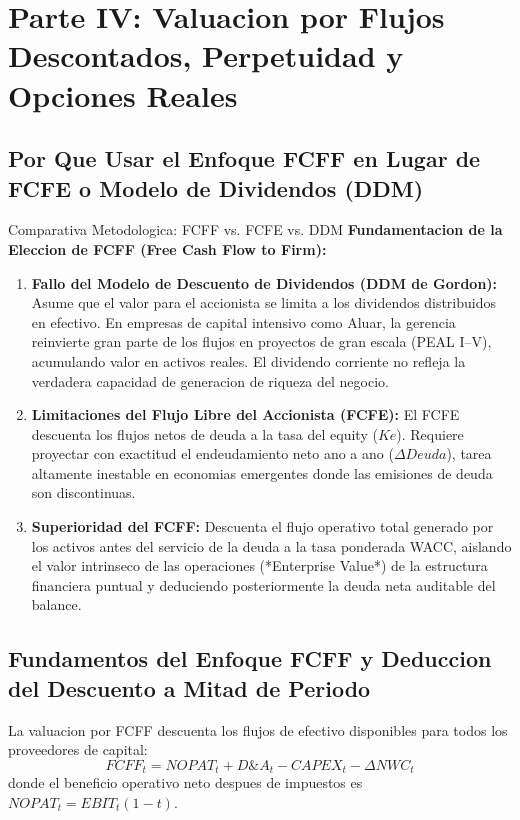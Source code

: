 \documentclass[10pt,a4paper]{article}
\theoremstyle{definition}
\begin{document}
\section{Parte IV: Valuacion por Flujos Descontados, Perpetuidad y Opciones Reales}

\subsection{Por Que Usar el Enfoque FCFF en Lugar de FCFE o Modelo de Dividendos (DDM)}

\begin{conceptbox}{Comparativa Metodologica: FCFF vs. FCFE vs. DDM}
\textbf{Fundamentacion de la Eleccion de FCFF (Free Cash Flow to Firm):}
\begin{enumerate}
    \item \textbf{Fallo del Modelo de Descuento de Dividendos (DDM de Gordon):} Asume que el valor para el accionista se limita a los dividendos distribuidos en efectivo. En empresas de capital intensivo como Aluar, la gerencia reinvierte gran parte de los flujos en proyectos de gran escala (PEAL I--V), acumulando valor en activos reales. El dividendo corriente no refleja la verdadera capacidad de generacion de riqueza del negocio.
    \item \textbf{Limitaciones del Flujo Libre del Accionista (FCFE):} El FCFE descuenta los flujos netos de deuda a la tasa del equity ($Ke$). Requiere proyectar con exactitud el endeudamiento neto ano a ano ($\Delta Deuda$), tarea altamente inestable en economias emergentes donde las emisiones de deuda son discontinuas.
    \item \textbf{Superioridad del FCFF:} Descuenta el flujo operativo total generado por los activos antes del servicio de la deuda a la tasa ponderada WACC, aislando el valor intrinseco de las operaciones (*Enterprise Value*) de la estructura financiera puntual y deduciendo posteriormente la deuda neta auditable del balance.
\end{enumerate}
\end{conceptbox}

\subsection{Fundamentos del Enfoque FCFF y Deduccion del Descuento a Mitad de Periodo}
La valuacion por FCFF descuenta los flujos de efectivo disponibles para todos los proveedores de capital:
\begin{equation}
FCFF_t = NOPAT_t + D\&A_t - CAPEX_t - \Delta NWC_t
\end{equation}
donde el beneficio operativo neto despues de impuestos es $NOPAT_t = EBIT_t(1 - t)$.
\end{document}
